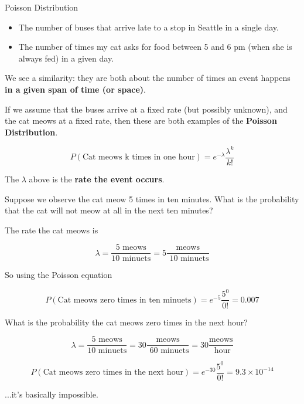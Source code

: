 %
\begin{frame}{Poisson Distribution}

\begin{itemize}
\item The number of buses that arrive late to a stop in Seattle in a single
day.
\item The number of times my cat asks for food between 5 and 6 pm (when she is
always fed) in a given day.
\end{itemize}

We see a similarity: they are both about the number of times an event happens
\textbf{in a given span of time (or space)}.
\end{frame}
%

%
\begin{frame}
If we assume that the buses arrive at a fixed rate (but possibly unknown), and
the cat meows at a fixed rate, then these are both examples of the
\textbf{Poisson Distribution}.

$$ P(\text{Cat meows k times in one hour}) = e^{-\lambda} \frac{\lambda^k}{k!}
$$

The $\lambda$ above is the \textbf{rate the event occurs}.
\end{frame}
%

%
\begin{frame}
Suppose we observe the cat meow 5 times in ten minutes.  What is the probability
that the cat will not meow at all in the next ten minutes?
\end{frame}
%

%
\begin{frame}
The rate the cat meows is

$$ \lambda = \frac{5 \text{ meows}}{10 \text{ minuets}} = 5 \frac{ \text{
meows}}{\text{ 10 minuets}} $$

So using the Poisson equation

$$ P(\text{Cat meows zero times in ten minuets}) = e^{-5} \frac{5^0}{0!} = 0.007
$$
\end{frame}
%

%
\begin{frame}
What is the probability the cat meows zero times in the next hour?

$$ 
\lambda = \frac{5 \text{ meows}}{10 \text{ minuets}} = 30 \frac{ \text{
meows}}{\text{ 60 minuets}} = 30 \frac{ \text{
meows}}{\text{ hour}}
$$

$$ P(\text{Cat meows zero times in the next hour}) = e^{-30} \frac{5^0}{0!} =
9.3 \times 10^{-14}
$$

...it's basically impossible.
\end{frame}
%

